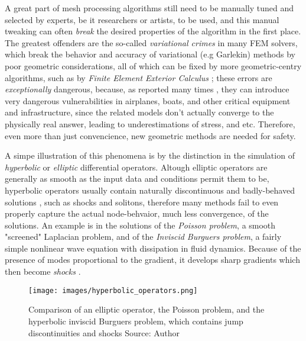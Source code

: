 \spa 

A great part of mesh processing algorithms still need to be
manually tuned and selected by experts, be it researchers or artists,
to be used, and this manual tweaking can often \textit{break}
the desired properties of the algorithm in the first place.
The greatest offenders are the so-called \textit{variational
crimes} \cite{szabo2024-not-all-models_crimes} in many FEM solvers, which break the behavior and accuracy
of variational (e.g Garlekin) methods by poor geometric
considerations, all of which can be fixed by more geometric-centry
algorithms, such as by \textit{Finite Element Exterior Calculus} \cite{Holst_2012_variationalCrimes}; these errors are \textit{exceptionally}
dangerous, because, as reported many times \cite{suri2024-cracks-sciam_variationalCrimes},
they can introduce very dangerous vulnerabilities in airplanes, boats, and
other critical equipment and infrastructure, since the related models
don't actually converge to the physically real answer, leading to
underestimations of stress, and etc. Therefore, even more than just
convencience, new geometric methods are needed for safety.


\spa

A simpe illustration of this phenomena is by the distinction in the simulation
of \textit{hyperbolic} or \textit{elliptic} differential operators.
Altough elliptic operators are generally as smooth as the input data and
conditions permit them to be, hyperbolic operators usually contain
naturally discontinuous and badly-behaved solutions \cite{singular_FEM}, 
such as shocks
and solitons, therefore many methods fail to even properly
capture the actual node-behvaior, much less convergence, of the solutions.
An example is in the solutions of the \textit{Poisson problem},
a smooth "screened" Laplacian problem,
and of the \textit{Inviscid Burguers problem}, a fairly simple
nonlinear wave equation with dissipation in fluid dynamics.
Because of the presence of modes proportional to the
gradient, it develops sharp gradients which then become
\textit{shocks} \cite{Cameron2025burgers}.

\begin{figure}[h]
    \centering
    \texttt{[image: images/hyperbolic\_operators.png]}
    \caption{Comparison of an elliptic operator, the Poisson problem,
    and the hyperbolic inviscid Burguers problem, which contains
    jump discontinuities and shocks Source: Author}
    \label{fig:two-vertical-images}
\end{figure}


